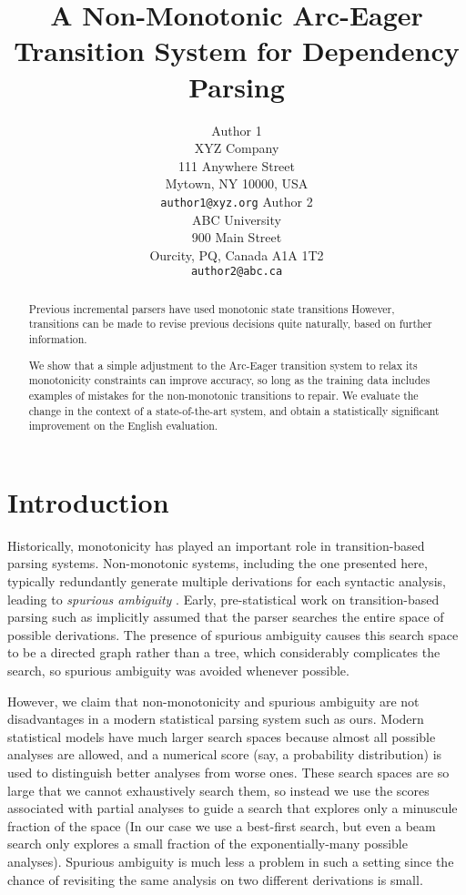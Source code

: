 \documentclass[11pt,letterpaper]{article}
\title{A Non-Monotonic Arc-Eager Transition System for Dependency Parsing}
\author{Author 1\\
	    XYZ Company\\
	    111 Anywhere Street\\
	    Mytown, NY 10000, USA\\
	    {\tt author1@xyz.org}
	  \And
	Author 2\\
  	ABC University\\
  	900 Main Street\\
  	Ourcity, PQ, Canada A1A 1T2\\
  {\tt author2@abc.ca}}
\date{}
\begin{document}
\maketitle
\begin{abstract}
    Previous incremental parsers have used monotonic state transitions
    However, transitions can be made to revise
    previous decisions quite naturally, based on further information.

    We show that a simple adjustment to the Arc-Eager transition system to relax its
    monotonicity constraints can improve accuracy, so long as the training data
    includes examples of mistakes for the non-monotonic transitions to repair.
    We evaluate the change in the context of a state-of-the-art system, and
    obtain a statistically significant improvement on the English
    evaluation.
\end{abstract}

\section{Introduction}


Historically, monotonicity has played an important role in transition-based parsing
systems.  Non-monotonic systems, including the one presented here, typically
redundantly generate multiple derivations for each syntactic analysis, leading to
{\em spurious ambiguity} \citep{Steedman00b}.  Early, pre-statistical work on transition-based
parsing such as \citet{Abney91} implicitly assumed that the parser searches the
entire space of possible derivations. The presence of spurious ambiguity causes
this search space to be a directed graph rather than a tree, which considerably
complicates the search, so spurious ambiguity was avoided whenever possible.

However, we claim that non-monotonicity and spurious ambiguity are not disadvantages in a
modern statistical parsing system such as ours.  Modern statistical models have
much larger search spaces because almost all possible analyses are allowed, and
a numerical score (say, a probability distribution) is used to distinguish better
analyses from worse ones.  These search spaces are so large that we cannot
exhaustively search them, so instead we use the scores associated with partial
analyses to guide a search that explores only a minuscule fraction of the space
(In our case we use a best-first search, but even a beam search only explores
a small fraction of the exponentially-many possible analyses). Spurious ambiguity
is much less a problem in such a setting since the chance of revisiting the same
analysis on two different derivations is small.
\end{document}
